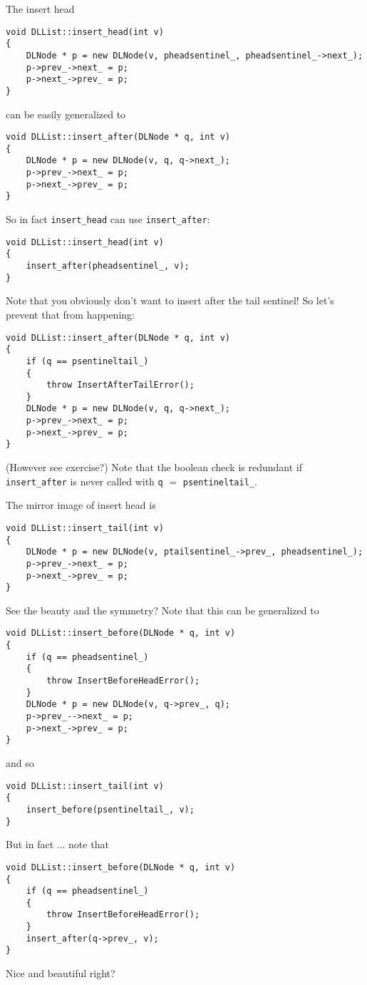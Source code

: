 The insert head
\begin{Verbatim}[frame=single,fontsize=\footnotesize]
void DLList::insert_head(int v)
{
    DLNode * p = new DLNode(v, pheadsentinel_, pheadsentinel_->next_);
    p->prev_->next_ = p;
    p->next_->prev_ = p;
}
\end{Verbatim}
can be easily generalized to
\begin{Verbatim}[frame=single,fontsize=\footnotesize]
void DLList::insert_after(DLNode * q, int v)
{
    DLNode * p = new DLNode(v, q, q->next_);
    p->prev_->next_ = p;
    p->next_->prev_ = p;
}
\end{Verbatim}
So in fact \verb!insert_head! can use \verb!insert_after!:
\begin{Verbatim}[frame=single,fontsize=\footnotesize]
void DLList::insert_head(int v)
{
    insert_after(pheadsentinel_, v);
}
\end{Verbatim}
Note that you obviously don't want to insert after the tail sentinel!
So let's prevent that from happening:
\begin{Verbatim}[frame=single,fontsize=\footnotesize]
void DLList::insert_after(DLNode * q, int v)
{
    if (q == psentineltail_)
    {
        throw InsertAfterTailError();
    }
    DLNode * p = new DLNode(v, q, q->next_);
    p->prev_->next_ = p;
    p->next_->prev_ = p;
}
\end{Verbatim}
(However see exercise?)
Note that the boolean check is redundant if \verb!insert_after!
is never called with \verb!q! $=$ \verb!psentineltail_!.

The mirror image of insert head is
\begin{Verbatim}[frame=single,fontsize=\footnotesize]
void DLList::insert_tail(int v)
{
    DLNode * p = new DLNode(v, ptailsentinel_->prev_, pheadsentinel_);
    p->prev_->next_ = p;
    p->next_->prev_ = p;
}
\end{Verbatim}
See the beauty and the symmetry?
Note that this can be generalized to
\begin{Verbatim}[frame=single,fontsize=\footnotesize]
void DLList::insert_before(DLNode * q, int v)
{
    if (q == pheadsentinel_)
    {
        throw InsertBeforeHeadError();
    }
    DLNode * p = new DLNode(v, q->prev_, q);
    p->prev_-->next_ = p;
    p->next_->prev_ = p;
}
\end{Verbatim}
and so
\begin{Verbatim}[frame=single,fontsize=\footnotesize]
void DLList::insert_tail(int v)
{
    insert_before(psentineltail_, v);
}
\end{Verbatim}
But in fact ... note that
\begin{Verbatim}[frame=single,fontsize=\footnotesize]
void DLList::insert_before(DLNode * q, int v)
{
    if (q == pheadsentinel_)
    {
        throw InsertBeforeHeadError();
    }
    insert_after(q->prev_, v);
}
\end{Verbatim}
Nice and beautiful right?



